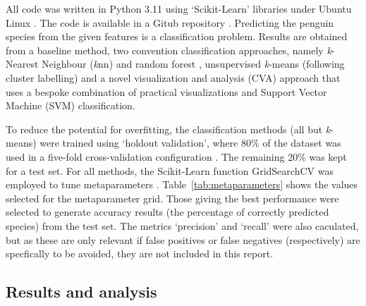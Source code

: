 \documentclass[12pt]{article}
\begin{document}
All code was written in Python 3.11 \cite{python311} using ‘Scikit-Learn’ libraries \cite{scikit-learn} 
under Ubuntu Linux \cite{ubuntu}. The code is available in a Gitub repository \cite{TimAIRepo}. 
Predicting the penguin species from the given features is a classification problem. 
Results are obtained from a baseline method, two convention classification approaches, 
namely \textit{k}-Nearest Neighbour (\textit{k}nn) \cite{bishop2006pattern} and random forest \cite{breiman2001random}, 
unsupervised \textit{k}-means (following cluster labelling) \cite{tan2005introduction} 
and a novel visualization and analysis (CVA) approach that uses a bespoke combination of 
practical visualizations and Support Vector Machine (SVM) classification.

To reduce the potential for overfitting, the classification methods (all but \textit{k}-means) were trained using 
`holdout validation', where 80\% of the dataset was used in a five-fold cross-validation 
configuration \cite{james2013introduction}. The remaining 20\% was kept for a test set. For all methods, 
the Scikit-Learn function GridSearchCV was employed to tune metaparameters \cite{scikit-learn}. 
Table~\ref{tab:metaparameters} shows the values selected for the metaparameter grid. Those giving the best 
performance were selected to generate accuracy results (the percentage of correctly predicted species) 
from the test set. The metrics `precision' and `recall' were also caculated, but as 
these are only relevant if false positives or false negatives (respectively) are specfically to be avoided, 
they are not included in this report.   

\subsection*{Results and analysis}
\end{document}
